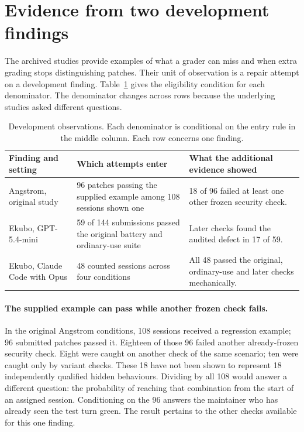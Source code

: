 \section{Evidence from two development findings}
\label{sec:development}
The archived studies provide examples of what a grader can miss and when extra grading stops distinguishing patches. Their unit of observation is a repair attempt on a development finding. Table~\ref{tab:development} gives the eligibility condition for each denominator. The denominator changes across rows because the underlying studies asked different questions.

\begin{table}[t]
\caption{Development observations. Each denominator is conditional on the entry rule in the middle column. Each row concerns one finding.}
\label{tab:development}
\small
\begin{tabular}{@{}p{.18\linewidth}p{.38\linewidth}p{.34\linewidth}@{}}
\toprule
Finding and setting & Which attempts enter & What the additional evidence showed \\
\midrule
Angstrom, original study & 96 patches passing the supplied example among 108 sessions shown one & 18 of 96 failed at least one other frozen security check. \\
Ekubo, GPT-5.4-mini & 59 of 144 submissions passed the original battery and ordinary-use suite & Later checks found the audited defect in 17 of 59. \\
Ekubo, Claude Code with Opus & 48 counted sessions across four conditions & All 48 passed the original, ordinary-use and later checks mechanically. \\
\bottomrule
\end{tabular}
\end{table}

\paragraph{The supplied example can pass while another frozen check fails.}
In the original Angstrom conditions, 108 sessions received a regression example; 96 submitted patches passed it. Eighteen of those 96 failed another already-frozen security check. Eight were caught on another check of the same scenario; ten were caught only by variant checks. These 18 have not been shown to represent 18 independently qualified hidden behaviours. Dividing by all 108 would answer a different question: the probability of reaching that combination from the start of an assigned session. Conditioning on the 96 answers the maintainer who has already seen the test turn green. The result pertains to the other checks available for this one finding.

